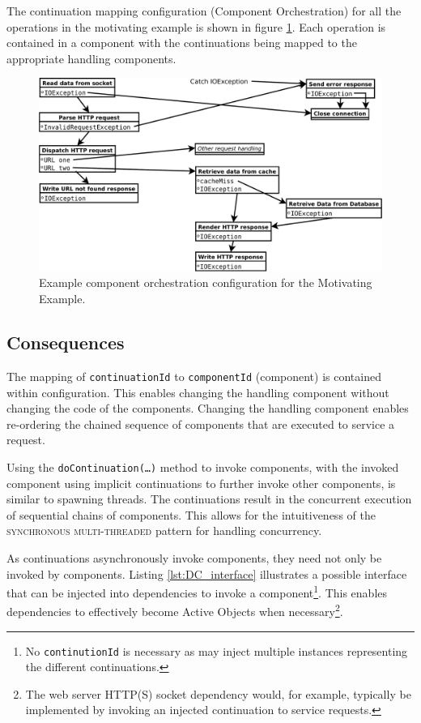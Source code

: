 \documentclass[prodmode]{style/acmlarge}
\begin{document}
The continuation mapping configuration (Component Orchestration) for all the
operations in the motivating example is shown in figure
\ref{fig:ExampleComponentOrchestration}.  Each operation is contained in a
component with the continuations being mapped to the appropriate handling
components.

\begin{figure}[!t]
\centering
\includegraphics[width=4.5in]{ContinuationInjectionComponentOrchestration}
\caption{Example component orchestration configuration for the Motivating Example.}
\label{fig:ExampleComponentOrchestration}
\end{figure}


\subsection{Consequences}

The mapping of \texttt{continuationId} to \texttt{componentId} (component) is
contained within configuration.  This enables changing the handling component
without changing the code of the components.  Changing the handling component
enables re-ordering the chained sequence of components that are executed to
service a request.

Using the \texttt{doContinuation(\ldots)} method to invoke components, with the
invoked component using implicit continuations to further invoke other
components, is similar to spawning threads.  The continuations result in the
concurrent execution of sequential chains of components.  This allows for the
intuitiveness of the \textsc{synchronous multi-threaded} pattern \cite{proactor}
for handling concurrency.

As continuations asynchronously invoke components, they need not only be invoked
by components. Listing \ref{lst:DC_interface} illustrates a possible interface
that can be injected into dependencies to invoke a component\footnote{No
\texttt{continutionId} is necessary as may inject multiple instances
representing the different continuations.}.  This enables dependencies to
effectively become Active Objects \cite{active-object} when
necessary\footnote{The web server HTTP(S) socket dependency would, for example,
typically be implemented by invoking an injected continuation to service
requests.}.
\end{document}
